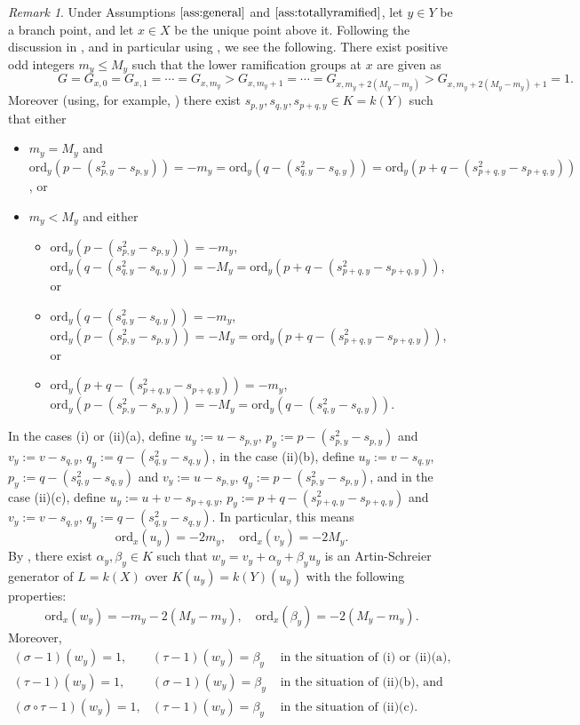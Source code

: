 \documentclass{amsart}
\numberwithin{equation}{section}
\numberwithin{table}{section}
\theoremstyle{plain}
\theoremstyle{definition}
\theoremstyle{remark}
\newtheorem{remark}[theorem]{Remark}
\begin{document}
\begin{remark}
\label{rem:twocases}
Under Assumptions $\ref{ass:general}$ and $\ref{ass:totallyramified}$, let $y\in Y$ be a branch point, and let $x\in X$ be the unique point above it. Following the discussion in \cite[Section 3]{WuScheidler2010}, and in particular using \cite[Equations (3.6) and (3.7) and Theorem 3.11]{WuScheidler2010}, we see the following. There exist positive odd integers $m_y\le M_y$ such that the lower ramification groups at $x$ are given as 
$$\qquad \qquad G=G_{x,0}=G_{x,1}=\cdots=G_{x,m_y} > G_{x,m_y+1}=\cdots = G_{x,m_y+2(M_y-m_y)}>G_{x,m_y+2(M_y-m_y)+1}=1.$$
Moreover (using, for example, \cite[Proposition 3.7.8]{Stichtenoth2009}) there exist $s_{p,y},s_{q,y},s_{p+q,y}\in K=k(Y)$ such that either 
\begin{itemize}
\item[(i)] $m_y=M_y$ and $\mathrm{ord}_y(p-(s_{p,y}^2-s_{p,y}))=-m_y=\mathrm{ord}_y(q-(s_{q,y}^2-s_{q,y})) =\mathrm{ord}_y(p+q-(s_{p+q,y}^2-s_{p+q,y}))$, or 
\item[(ii)] $m_y< M_y$ and either
	\begin{itemize}
	\item[(a)] $\mathrm{ord}_y(p-(s_{p,y}^2-s_{p,y}))=-m_y$, $\mathrm{ord}_y(q-(s_{q,y}^2-s_{q,y}))=-M_y=\mathrm{ord}_y(p+q-(s_{p+q,y}^2-s_{p+q,y}))$, or 
	\item[(b)] $\mathrm{ord}_y(q-(s_{q,y}^2-s_{q,y}))=-m_y$, $\mathrm{ord}_y(p-(s_{p,y}^2-s_{p,y}))=-M_y=\mathrm{ord}_y(p+q-(s_{p+q,y}^2-s_{p+q,y}))$, or 
	\item[(c)] $\mathrm{ord}_y(p+q-(s_{p+q,y}^2-s_{p+q,y}))=-m_y$, $\mathrm{ord}_y(p-(s_{p,y}^2-s_{p,y}))=-M_y=\mathrm{ord}_y(q-(s_{q,y}^2-s_{q,y}))$.
	\end{itemize}
\end{itemize}
In the cases (i) or (ii)(a), define $u_y:=u-s_{p,y}$, $p_y:=p-(s_{p,y}^2-s_{p,y})$ and $v_y:=v-s_{q,y}$, $q_y :=q-(s_{q,y}^2-s_{q,y})$, in the case (ii)(b), define $u_y:=v-s_{q,y}$, $p_y:=q-(s_{q,y}^2-s_{q,y})$ and $v_y:=u-s_{p,y}$, $q_y :=p-(s_{p,y}^2-s_{p,y})$, and in the case (ii)(c), define $u_y:=u+v-s_{p+q,y}$, $p_y:=p+q-(s_{p+q,y}^2-s_{p+q,y})$ and $v_y:=v-s_{q,y}$, $q_y :=q-(s_{q,y}^2-s_{q,y})$. In particular, this means
$$\mathrm{ord}_x(u_y)=-2m_y,\quad \mathrm{ord}_x(v_y)=-2M_y.$$
By \cite[Corollary 3.10 and the proof of Theorem 3.11]{WuScheidler2010}, there exist $\alpha_y , \beta_y \in K$ such that $w_y = v_y + \alpha_y + \beta_y u_y$ is an Artin-Schreier generator of $L=k(X)$ over $K(u_y)=k(Y)(u_y)$ with the following properties:
$$\mathrm{ord}_x(w_y)=-m_y-2(M_y-m_y),\quad\mathrm{ord}_x(\beta_y)=-2(M_y-m_y).$$
Moreover,
$$\begin{array}{lll}
(\sigma -1)(w_y) = 1, & (\tau-1)(w_y) = \beta_y &\mbox{ in the situation of (i) or (ii)(a),}\\
(\tau-1)(w_y) = 1, & (\sigma -1)(w_y) = \beta_y &\mbox{ in the situation of (ii)(b), and}\\
(\sigma\circ\tau -1)(w_y) = 1, & (\tau -1)(w_y) = \beta_y &\mbox{ in the situation of (ii)(c).}
\end{array}$$
\end{remark}
\end{document}

